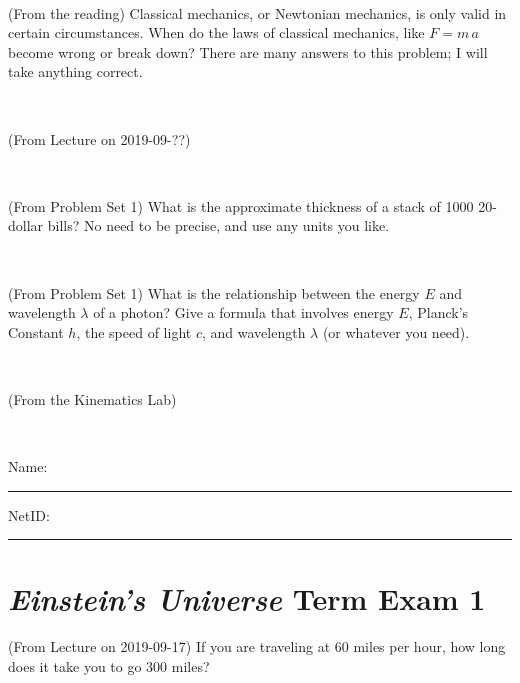 \documentclass[12pt, letterpaper]{article}
\begin{document}
\vfill ~

\begin{problem} (From the reading)
Classical mechanics, or Newtonian mechanics, is only valid in certain
circumstances. When do the laws of classical mechanics, like $F =
m\,a$ become wrong or break down? There are many answers to this
problem; I will take anything correct.
\end{problem}


\vfill ~


\clearpage


\begin{problem} (From Lecture on 2019-09-??)
\end{problem}


\vfill ~

\begin{problem} (From Problem Set 1)
What is the approximate thickness of a stack of 1000 20-dollar bills?
No need to be precise, and use any units you like.
\end{problem}


\vfill ~

\begin{problem} (From Problem Set 1)
What is the relationship between the energy $E$ and wavelength
$\lambda$ of a photon? Give a formula that involves energy $E$,
Planck's Constant $h$, the speed of light $c$, and wavelength
$\lambda$ (or whatever you need).
\end{problem}

\vfill ~

\begin{problem} (From the Kinematics Lab)

\end{problem}


\vfill ~


\cleardoublepage



\noindent
Name: \rule[-1ex]{0.60\textwidth}{0.1pt}
NetID: \rule[-1ex]{0.20\textwidth}{0.1pt}

\section*{\textsl{Einstein's Universe} Term Exam 1}
\setcounter{problem}{1}


\begin{problem} (From Lecture on 2019-09-17)
If you are traveling at 60 miles per hour, how long does
it take you to go 300 miles?
\end{problem}
\end{document}
